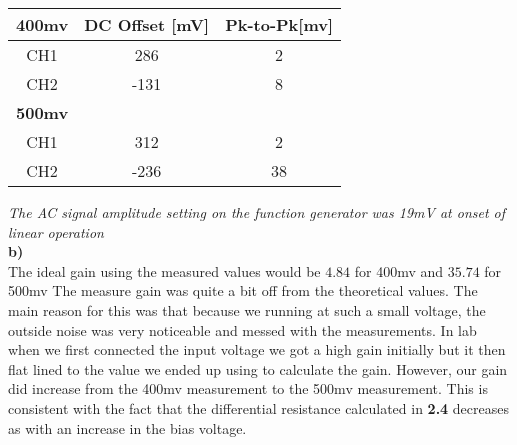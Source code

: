\documentclass[12pt, oneside]{article}
\begin{document}
\begin{center}
 \begin{tabular}{||c | c | c||} 
 \hline
   \textbf{400mv} & DC Offset [mV] & Pk-to-Pk[mv]\\ 
 \hline
 CH1 & 286 & 2\\
 \hline
  CH2 & -131 & 8\\
  \hline
  \textbf{500mv}& &  \\

 \hline
 CH1 & 312 & 2\\
 \hline
  CH2 & -236 & 38\\
 
 \hline
\end{tabular}
\end{center}
\textit{The AC signal amplitude setting on the function generator was 19mV at onset of linear operation}\\
\textbf{b)}\\
The ideal gain using the measured values would be $4.84$ for 400mv and $35.74$ for 500mv
The measure gain was quite a bit off from the theoretical values. The main reason for this was that because we running at such a small voltage, the outside noise was very noticeable and messed with the measurements. In lab when we first connected the input voltage we got a high gain initially but it then flat lined to the value we ended up using to calculate the gain. However, our gain did increase from the 400mv measurement to the 500mv measurement. This is consistent with the fact that the differential resistance calculated in \textbf{2.4} decreases as with an increase in the bias voltage.
\end{document}
